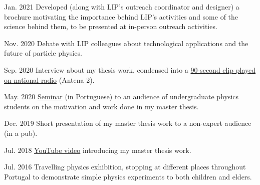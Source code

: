 \begin{cventries}
    {}{Jan. 2021}
    {Developed (along with LIP's outreach coordinator and designer) a brochure motivating the importance behind LIP's activities and some of the science behind them, to be presented at in-person outreach activities.}

    {}{Nov. 2020}
    {Debate with LIP colleagues about technological applications and the future of particle physics.} 

    {}{Sep. 2020}
    {Interview about my thesis work, condensed into a \href{https://www.rtp.pt/play/p2936/e491211/90-segundos-ciencia}{90-second clip played on national radio} (Antena 2).}

    {}{May. 2020}
    {\href{https://www.youtube.com/watch?v=LSVwibOst74}{Seminar} (in Portuguese) to an audience of undergraduate physics students on the motivation and work done in my master thesis.}

    {}{Dec. 2019}
    {Short presentation of my master thesis work to a non-expert audience (in a pub).}

    {}{Jul. 2018}
    {\href{https://youtu.be/gYDkRYdr_D4}{YouTube video} introducing my master thesis work.}

    {}{Jul. 2016}
    {Travelling physics exhibition, stopping at different places throughout Portugal to demonstrate simple physics experiments to both children and elders.}

\end{cventries}